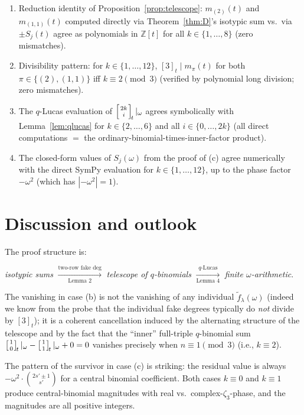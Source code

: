 \documentclass[11pt]{article}
\theoremstyle{definition}
\theoremstyle{remark}
\newcommand{\fdeg}{\widetilde{f}}
\newcommand{\qbinom}[2]{\left[{#1 \atop #2}\right]_{\!t}}
\begin{document}
\begin{enumerate}
\item Reduction identity of Proposition~\ref{prop:telescope}: $m_{(2)}(t)$
and $m_{(1,1)}(t)$ computed directly via
Theorem~\ref{thm:D}'s isotypic sum vs.\ via $\pm S_j(t)$ agree as polynomials
in $\mathbb{Z}[t]$ for all $k \in \{1, \ldots, 8\}$ (zero mismatches).
\item Divisibility pattern: for $k \in \{1, \ldots, 12\}$,
$[3]_t \mid m_\pi(t)$ for both $\pi \in \{(2), (1,1)\}$ iff
$k \equiv 2 \pmod 3$ (verified by polynomial long division; zero mismatches).
\item The $q$-Lucas evaluation of $\qbinom{2k}{i}|_\omega$ agrees
symbolically with Lemma~\ref{lem:qlucas} for $k \in \{2, \ldots, 6\}$
and all $i \in \{0, \ldots, 2k\}$ (all direct computations $=$ the
ordinary-binomial-times-inner-factor product).
\item The closed-form values of $S_j(\omega)$ from the proof of (c)
agree numerically with the direct SymPy evaluation
for $k \in \{1, \ldots, 12\}$, up to the phase factor $-\omega^2$ (which
has $|-\omega^2| = 1$).
\end{enumerate}

\section{Discussion and outlook}

The proof structure is:
\begin{center}
\emph{isotypic sums} $\xrightarrow[\text{Lemma 2}]{\text{two-row fake deg}}$
\emph{telescope of $q$-binomials} $\xrightarrow[\text{Lemma 4}]{q\text{-Lucas}}$
\emph{finite $\omega$-arithmetic}.
\end{center}
The vanishing in case (b) is not the vanishing of any individual
$\fdeg_\lambda(\omega)$ (indeed we know from the probe that the
individual fake degrees typically do \emph{not} divide by $[3]_t$); it
is a coherent cancellation induced by the alternating structure of the
telescope and by the fact that the ``inner'' full-triple
$q$-binomial sum $\qbinom{1}{0}|_\omega - \qbinom{1}{1}|_\omega + 0 = 0$
vanishes precisely when $n \equiv 1 \pmod 3$ (i.e., $k \equiv 2$).

The pattern of the survivor in case (c) is striking: the residual value
is always $-\omega^2 \cdot \binom{2s' \pm 1}{s'}$ for a central binomial
coefficient. Both cases $k \equiv 0$ and $k \equiv 1$ produce
central-binomial magnitudes with real vs.\ complex-$\zeta_3$-phase, and
the magnitudes are all positive integers.
\end{document}
